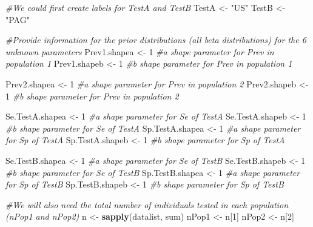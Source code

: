 \documentclass[
]{book}
\newenvironment{Shaded}{\begin{snugshade}}{\end{snugshade}}
\newcommand{\CommentTok}[1]{\textcolor[rgb]{0.56,0.35,0.01}{\textit{#1}}}
\newcommand{\DecValTok}[1]{\textcolor[rgb]{0.00,0.00,0.81}{#1}}
\newcommand{\FunctionTok}[1]{\textcolor[rgb]{0.13,0.29,0.53}{\textbf{#1}}}
\newcommand{\NormalTok}[1]{#1}
\newcommand{\OtherTok}[1]{\textcolor[rgb]{0.56,0.35,0.01}{#1}}
\newcommand{\StringTok}[1]{\textcolor[rgb]{0.31,0.60,0.02}{#1}}
\begin{document}
\begin{Shaded}
\begin{Highlighting}[]
\CommentTok{\#We could first create labels for TestA and TestB}
\NormalTok{TestA }\OtherTok{\textless{}{-}} \StringTok{"US"}
\NormalTok{TestB }\OtherTok{\textless{}{-}} \StringTok{"PAG"}

\CommentTok{\#Provide information for the prior distributions (all beta distributions) for the 6 unknown parameters }
\NormalTok{Prev1.shapea }\OtherTok{\textless{}{-}} \DecValTok{1}         \CommentTok{\#a shape parameter for Prev in population 1    }
\NormalTok{Prev1.shapeb }\OtherTok{\textless{}{-}} \DecValTok{1}         \CommentTok{\#b shape parameter for Prev in population 1}

\NormalTok{Prev2.shapea }\OtherTok{\textless{}{-}} \DecValTok{1}         \CommentTok{\#a shape parameter for Prev in population 2    }
\NormalTok{Prev2.shapeb }\OtherTok{\textless{}{-}} \DecValTok{1}         \CommentTok{\#b shape parameter for Prev in population 2}

\NormalTok{Se.TestA.shapea }\OtherTok{\textless{}{-}} \DecValTok{1}     \CommentTok{\#a shape parameter for Se of TestA}
\NormalTok{Se.TestA.shapeb }\OtherTok{\textless{}{-}} \DecValTok{1}     \CommentTok{\#b shape parameter for Se of TestA}
\NormalTok{Sp.TestA.shapea }\OtherTok{\textless{}{-}} \DecValTok{1}     \CommentTok{\#a shape parameter for Sp of TestA}
\NormalTok{Sp.TestA.shapeb }\OtherTok{\textless{}{-}} \DecValTok{1}     \CommentTok{\#b shape parameter for Sp of TestA}

\NormalTok{Se.TestB.shapea }\OtherTok{\textless{}{-}} \DecValTok{1}     \CommentTok{\#a shape parameter for Se of TestB}
\NormalTok{Se.TestB.shapeb }\OtherTok{\textless{}{-}} \DecValTok{1}     \CommentTok{\#b shape parameter for Se of TestB}
\NormalTok{Sp.TestB.shapea }\OtherTok{\textless{}{-}} \DecValTok{1}     \CommentTok{\#a shape parameter for Sp of TestB}
\NormalTok{Sp.TestB.shapeb }\OtherTok{\textless{}{-}} \DecValTok{1}     \CommentTok{\#b shape parameter for Sp of TestB}

\CommentTok{\#We will also need the total number of individuals tested in each population (nPop1 and nPop2)}
\NormalTok{n }\OtherTok{\textless{}{-}} \FunctionTok{sapply}\NormalTok{(datalist, sum)}
\NormalTok{nPop1 }\OtherTok{\textless{}{-}}\NormalTok{ n[}\DecValTok{1}\NormalTok{]}
\NormalTok{nPop2 }\OtherTok{\textless{}{-}}\NormalTok{ n[}\DecValTok{2}\NormalTok{]}
\end{Highlighting}
\end{Shaded}
\end{document}
